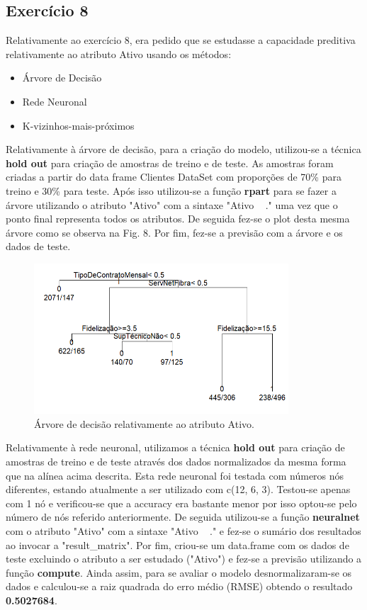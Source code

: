 \subsection{Exercício 8}
Relativamente ao exercício 8, era pedido que se estudasse a capacidade preditiva relativamente ao atributo Ativo usando os métodos: 
\begin{itemize}
\item Árvore de Decisão
\item Rede Neuronal
\item K-vizinhos-mais-próximos
\end{itemize} 

Relativamente à árvore de decisão, para a criação do modelo, utilizou-se a técnica \textbf{hold out} para criação de amostras de treino e de teste. As amostras foram criadas a partir do data frame Clientes DataSet com proporções de 70\% para treino e 30\% para teste. Após isso utilizou-se a função \textbf{rpart} para se fazer a árvore utilizando o atributo "Ativo" com a sintaxe "Ativo ~ ." uma vez que o ponto final representa todos os atributos. De seguida fez-se o plot desta mesma árvore como se observa na Fig. 8. Por fim, fez-se a previsão com a árvore e os dados de teste. 

\begin{figure}[htbp]
\centerline{\includegraphics[width=9.5cm]{images/ex8_arvore_de_decisao.png}}
\caption{Árvore de decisão relativamente ao atributo Ativo.}
\label{ex8_arvore_de_decisao}
\end{figure}

Relativamente à rede neuronal, utilizamos a técnica \textbf{hold out} para criação de amostras de treino e de teste através dos dados normalizados da mesma forma que na alínea acima descrita. Esta rede neuronal foi testada com números nós diferentes, estando atualmente a ser utilizado com c(12, 6, 3). Testou-se apenas com 1 nó e verificou-se que a accuracy era bastante menor por isso optou-se pelo número de nós referido anteriormente. De seguida utilizou-se a função \textbf{neuralnet} com o atributo "Ativo" com a sintaxe "Ativo ~ ." e fez-se o sumário dos resultados ao invocar a "result\_matrix". Por fim, criou-se um data.frame com os dados de teste excluindo o atributo a ser estudado ("Ativo") e fez-se a previsão utilizando a função \textbf{compute}. Ainda assim, para se avaliar o modelo desnormalizaram-se os dados e calculou-se a raiz quadrada do erro médio (RMSE) obtendo o resultado \textbf{0.5027684}.

